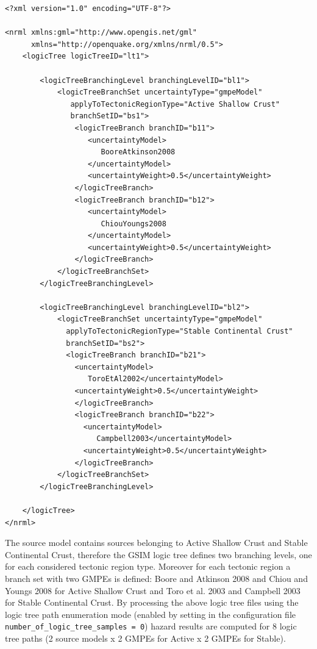 \begin{Verbatim}[frame=single, commandchars=\\\{\}, fontsize=\normalsize]
<?xml version="1.0" encoding="UTF-8"?>

<nrml xmlns:gml="http://www.opengis.net/gml"
      xmlns="http://openquake.org/xmlns/nrml/0.5">
    <logicTree logicTreeID="lt1">

        <logicTreeBranchingLevel branchingLevelID="bl1">
            <logicTreeBranchSet uncertaintyType="gmpeModel"
               applyToTectonicRegionType="Active Shallow Crust"
               branchSetID="bs1">
                <logicTreeBranch branchID="b11">
                   <uncertaintyModel>
                      BooreAtkinson2008
                   </uncertaintyModel>
                   <uncertaintyWeight>0.5</uncertaintyWeight>
                </logicTreeBranch>
                <logicTreeBranch branchID="b12">
                   <uncertaintyModel>
                      ChiouYoungs2008
                   </uncertaintyModel>
                   <uncertaintyWeight>0.5</uncertaintyWeight>
                </logicTreeBranch>
            </logicTreeBranchSet>
        </logicTreeBranchingLevel>

        <logicTreeBranchingLevel branchingLevelID="bl2">
            <logicTreeBranchSet uncertaintyType="gmpeModel"
              applyToTectonicRegionType="Stable Continental Crust"
              branchSetID="bs2">
              <logicTreeBranch branchID="b21">
                <uncertaintyModel>
                   ToroEtAl2002</uncertaintyModel>
                <uncertaintyWeight>0.5</uncertaintyWeight>
                </logicTreeBranch>
                <logicTreeBranch branchID="b22">
                  <uncertaintyModel>
                     Campbell2003</uncertaintyModel>
                  <uncertaintyWeight>0.5</uncertaintyWeight>
                </logicTreeBranch>
            </logicTreeBranchSet>
        </logicTreeBranchingLevel>

    </logicTree>
</nrml>
\end{Verbatim}

The source model contains sources belonging to Active Shallow Crust and
Stable Continental Crust, therefore the GSIM logic tree defines two branching
levels, one for each considered tectonic region type. Moreover for each
tectonic region a branch set with two GMPEs is defined: Boore and Atkinson
2008 and Chiou and Youngs 2008 for Active Shallow Crust and Toro et al. 2003
and Campbell 2003 for Stable Continental Crust. By processing the above logic
tree files using the logic tree path enumeration mode (enabled by setting in
the configuration file \texttt{number\_\-of\_\-logic\_\-tree\_\-samples = 0})
hazard results are computed for 8 logic tree paths (2 source models x 2 GMPEs
for Active x 2 GMPEs for Stable).

